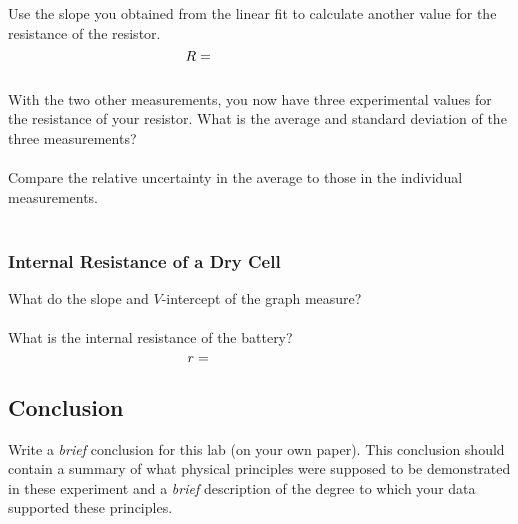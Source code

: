 \noindent
Use the slope you obtained from the linear fit to calculate another value
for the resistance of the resistor. \\
\vspace*{2mm}
$$R=\mbox{\hspace*{3cm}}$$
\vspace*{1mm}\\
With the two other measurements, you now
have three experimental values for the resistance of your resistor. 
What is the average and standard deviation of the three measurements? \\
\vspace*{1.5cm} \\
Compare the relative uncertainty in the average to those in the individual 
measurements. \\
\ \\


\subsubsection{Internal Resistance of a Dry Cell}
What do the slope and $V$-intercept of the graph measure? \\
\vspace*{1cm}\\
What is the internal resistance of the battery? \\
\vspace*{2mm}
$$r=\mbox{\hspace*{3cm}}$$

\subsection{Conclusion}
Write a {\it brief} conclusion for this lab (on your own paper). This 
conclusion should contain a summary of what physical principles were 
supposed to be demonstrated in these experiment and a {\it brief} description 
of the degree to which your data supported these principles.



\renewcommand{\thesection}{\thechapter.\arabic{section}}


